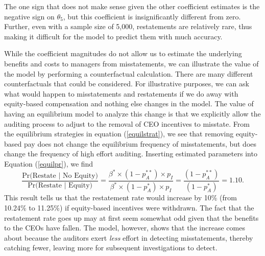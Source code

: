 
The one sign that does not make sense given the other coefficient estimates is the negative sign on $\theta_5$, but this coefficient is insignificantly different from zero.
Further, even with a sample size of 5,000, restatements are relatively rare, thus making it difficult for the model to predict them with much accuracy. 

While the coefficient magnitudes do not allow us to estimate the underlying benefits and costs to managers from misstatements, we can illustrate the value of the model by performing a counterfactual calculation.
There are many different counterfactuals that could be considered. 
For illustrative purposes, we can ask what would happen to misstatements and restatements if we do away with equity-based compensation and nothing else changes in the model.
The value of having an equilibrium model to analyze this change is that we explicitly allow the auditing process to adjust to the removal of CEO incentives to misstate. 
From the equilibrium strategies in equation (\ref{equilstrat}), we see that removing equity-based pay does not change the equilibrium frequency of misstatements, but does change the frequency of high effort auditing.
Inserting estimated parameters into Equation (\ref{equilpr}), we find
$$ \dfrac{\mbox{Pr(Restate }\vert \mbox{ No Equity)}}{\mbox{Pr(Restate }\vert \mbox{ Equity)}}=\dfrac{\beta^* \times (1-p_A^{**}) \times p_{I}}
{\beta^* \times (1-p_A^{*}) \times p_{I}} = \dfrac{(1-p_A^{**})}{(1-p_A^*)} = 1.10.$$
This result tells us that the restatement rate would increase by 10\% (from 10.24\% to 11.25\%) if equity-based incentives were withdrawn. 
The fact that the restatement rate goes up may at first seem somewhat odd given that the benefits to the CEOs have fallen. 
The model, however, shows that the increase  comes about because the auditors exert \emph{less} effort in detecting misstatements, thereby catching fewer, leaving more for subsequent investigations to detect.

